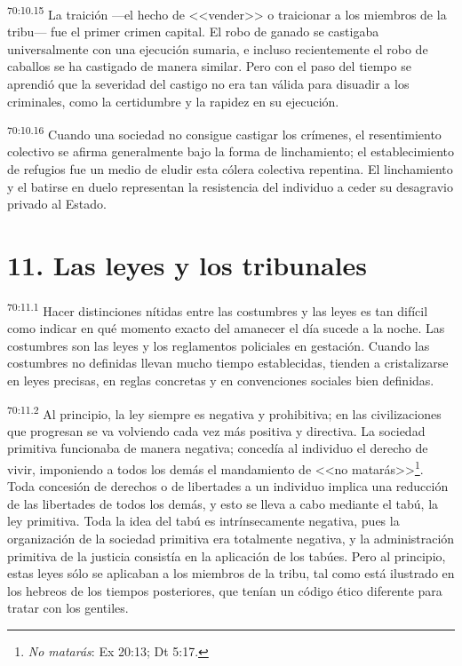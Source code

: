 \documentclass[twoside, 11pt]{book}
\begin{document}
\par
\textsuperscript{70:10.15} La traición ---el hecho de <<vender>> o traicionar a los miembros de la tribu--- fue el primer crimen capital. El robo de ganado se castigaba universalmente con una ejecución sumaria, e incluso recientemente el robo de caballos se ha castigado de manera similar. Pero con el paso del tiempo se aprendió que la severidad del castigo no era tan válida para disuadir a los criminales, como la certidumbre y la rapidez en su ejecución.

\par
\textsuperscript{70:10.16} Cuando una sociedad no consigue castigar los crímenes, el resentimiento colectivo se afirma generalmente bajo la forma de linchamiento; el establecimiento de refugios fue un medio de eludir esta cólera colectiva repentina. El linchamiento y el batirse en duelo representan la resistencia del individuo a ceder su desagravio privado al Estado.

\section*{11. Las leyes y los tribunales}
\par
\textsuperscript{70:11.1} Hacer distinciones nítidas entre las costumbres y las leyes es tan difícil como indicar en qué momento exacto del amanecer el día sucede a la noche. Las costumbres son las leyes y los reglamentos policiales en gestación. Cuando las costumbres no definidas llevan mucho tiempo establecidas, tienden a cristalizarse en leyes precisas, en reglas concretas y en convenciones sociales bien definidas.

\par
\textsuperscript{70:11.2} Al principio, la ley siempre es negativa y prohibitiva; en las civilizaciones que progresan se va volviendo cada vez más positiva y directiva. La sociedad primitiva funcionaba de manera negativa; concedía al individuo el derecho de vivir, imponiendo a todos los demás el mandamiento de <<no matarás>>\footnote{\textit{No matarás}: Ex 20:13; Dt 5:17.}. Toda concesión de derechos o de libertades a un individuo implica una reducción de las libertades de todos los demás, y esto se lleva a cabo mediante el tabú, la ley primitiva. Toda la idea del tabú es intrínsecamente negativa, pues la organización de la sociedad primitiva era totalmente negativa, y la administración primitiva de la justicia consistía en la aplicación de los tabúes. Pero al principio, estas leyes sólo se aplicaban a los miembros de la tribu, tal como está ilustrado en los hebreos de los tiempos posteriores, que tenían un código ético diferente para tratar con los gentiles.
\end{document}
